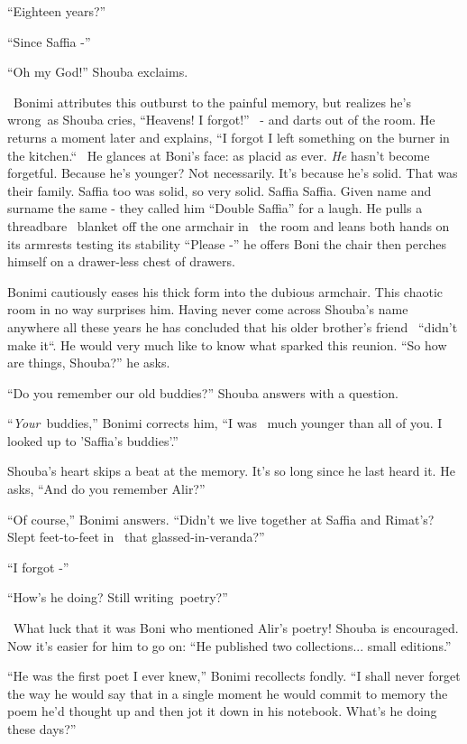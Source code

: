 \documentclass[twoside,11pt]{book}
\begin{document}
``Eighteen years?''

``Since Saffia -''

``Oh my God!'' Shouba exclaims.

~Bonimi attributes this outburst to the painful memory, but realizes he's wrong~as Shouba cries,
``Heavens!{ }I forgot!''
{\ }{}- and darts out of the room. He returns a moment later and explains,
``I forgot I left something on the burner in the kitchen.``~ He glances at Boni's face: as
placid as ever. \textit{He} hasn't become forgetful. Because he's younger? Not necessarily. It's because he's solid.
That was their family. Saffia too was solid, so very solid. Saffia Saffia. Given name and surname the same - they
called him ``Double Saffia'' for a laugh. He pulls a threadbare \ blanket off the one
armchair in~ the room and leans both hands on its armrests testing its stability ``Please -''
he offers Boni the chair then perches himself on a drawer-less chest of drawers.

Bonimi cautiously eases his thick form into the dubious armchair. This chaotic room in no way surprises him. Having
never come across Shouba's name anywhere all these years he has concluded that his older brother's friend \ {}``didn't
make it``. He would very much like to know what sparked this reunion. ``So how are things,
Shouba?'' he asks.

``Do you remember our old buddies?'' Shouba answers with a question.

``\textit{Your}~buddies,'' Bonimi corrects him, ``I was ~much younger than all of you. I looked up to
'Saffia's buddies'.''

Shouba's heart skips a beat at the memory. It's so long since he last heard it. He asks, ``And do you
remember Alir?''

``Of course,'' Bonimi answers. ``Didn't we live together at Saffia and Rimat's?
Slept feet-to-feet in{~} that glassed-in-veranda?''

``I forgot -''

``How's he doing? Still writing~poetry?''

~What luck that it was Boni who mentioned Alir's poetry! Shouba is encouraged. Now it's easier for him to go on:
``He published two collections... small{ }editions.''

``He was the first poet I ever knew,'' Bonimi recollects fondly. ``I shall never
forget the way he would say that in a single moment he would commit to memory the poem he'd thought up and then jot it
down in his notebook. What's he doing these days?''
\end{document}
